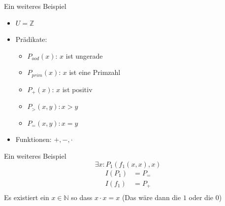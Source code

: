 \begin{frame}{Ein weiteres Beispiel}
	\begin{itemize}
		\item $U = \mathbb Z$
		\item Prädikate:
		      \begin{itemize}
			      \item $P_{ood}(x)$: $x$ ist ungerade
			      \item $P_{prim}(x)$: $x$ ist eine Primzahl
			      \item $P_{+}(x)$: $x$ ist positiv
			      \item $P_>(x,y): x>y$
			      \item $P_=(x,y): x=y$
		      \end{itemize}
		\item Funktionen: $+, -, \cdot$
	\end{itemize}
\end{frame}

\begin{frame}{Ein weiteres Beispiel}
	$$\exists x: P_1(f_1(x,x),x)$$
	\pause
	\begin{align*}
		I(P_1) & = P_{=} \\
		I(f_1) & = P_{+} \\
	\end{align*}
	\pause
	Es existiert ein $x \in \mathbb N$ so dass $x\cdot x = x$
	(Das wäre dann die $1$ oder die $0$)
\end{frame}

